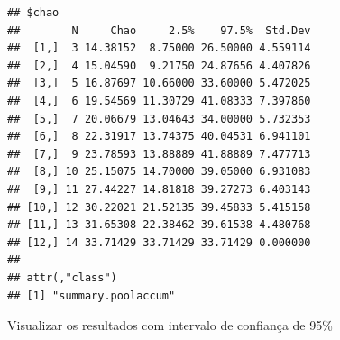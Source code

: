 \documentclass[
]{book}
\begin{document}
\begin{verbatim}
## $chao
##        N     Chao     2.5%    97.5%  Std.Dev
##  [1,]  3 14.38152  8.75000 26.50000 4.559114
##  [2,]  4 15.04590  9.21750 24.87656 4.407826
##  [3,]  5 16.87697 10.66000 33.60000 5.472025
##  [4,]  6 19.54569 11.30729 41.08333 7.397860
##  [5,]  7 20.06679 13.04643 34.00000 5.732353
##  [6,]  8 22.31917 13.74375 40.04531 6.941101
##  [7,]  9 23.78593 13.88889 41.88889 7.477713
##  [8,] 10 25.15075 14.70000 39.05000 6.931083
##  [9,] 11 27.44227 14.81818 39.27273 6.403143
## [10,] 12 30.22021 21.52135 39.45833 5.415158
## [11,] 13 31.65308 22.38462 39.61538 4.480768
## [12,] 14 33.71429 33.71429 33.71429 0.000000
## 
## attr(,"class")
## [1] "summary.poolaccum"
\end{verbatim}

Visualizar os resultados com intervalo de confiança de 95\%
\end{document}
